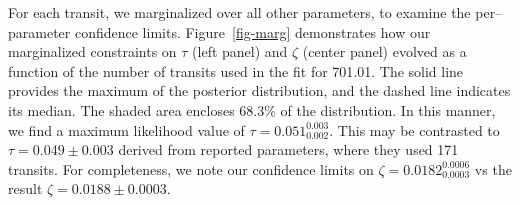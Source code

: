 %
%
For each transit, we marginalized over all other parameters, to
examine the per--parameter confidence limits.  Figure~\ref{fig-marg}
demonstrates how our marginalized constraints on $\tau$ (left panel)
and $\zeta$ (center panel) evolved as a function of the number of
transits used in the fit for 701.01.  The solid line provides the
maximum of the posterior distribution, and the dashed line indicates
its median.  The shaded area encloses 68.3\% of the distribution.  In
this manner, we find a maximum likelihood value of $\tau =
0.051_{0.002}^{0.003}$.  This may be contrasted to $\tau = 0.049 \pm
0.003 $ derived from reported \cite{2013arXiv1304.7387B} parameters,
where they used 171 transits.  For completeness, we note our
confidence limits on $\zeta = 0.0182_{0.0003}^{0.0006}$ vs
the \cite{2013arXiv1304.7387B} result $\zeta = 0.0188 \pm 0.0003$.




